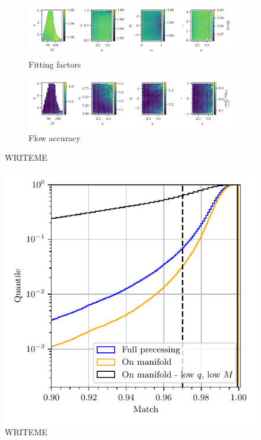 \documentclass[twocolumn,showpacs,preprintnumbers,nofootinbib,prd,
superscriptaddress,10pt]{revtex4-2}
\begin{document}
\begin{figure}[t]
	\centering
	\begin{subfigure}[t]{\textwidth}
		\includegraphics[scale = 1.]{precessing_injections}
		\caption{Fitting factors}
	\end{subfigure}
	\begin{subfigure}[t]{\textwidth}
		\includegraphics[scale = 1.]{precessing_flow_accuracy}
		\caption{Flow accuracy}
	\end{subfigure}
	\caption{WRITEME}
	\label{fig:precessing_injections}
\end{figure}


\begin{figure}[t]
	\centering
	\includegraphics[scale = 1.]{precessing_hist}
	\caption{WRITEME}
	\label{fig:precessing_hist}
\end{figure}
\end{document}
